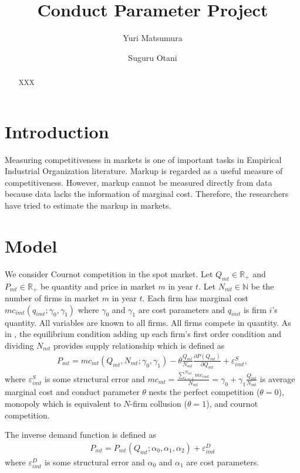 \documentclass[11pt]{article}
\title{Conduct Parameter Project}
\author{Yuri Matsumura \and Suguru Otani}
\begin{document}
\maketitle

\begin{abstract}
    XXX
\end{abstract}

\section{Introduction}
Measuring competitiveness in markets is one of important tasks in Empirical Industrial Organization literature.
Markup is regarded as a useful measure of competitiveness. 
However, markup cannot be measured directly from data because data lacks the information of marginal cost.
Therefore, the researchers have tried to estimate the markup in markets.



\section{Model}
We consider Cournot competition in the spot market. Let $Q_{mt}\in\mathbb{R}_{+}$ and $P_{mt}\in\mathbb{R}_{+}$ be quantity and price in market $m$ in year $t$. Let $N_{mt}\in\mathbb{N}$ be the number of firms in market $m$ in year $t$. Each firm has marginal cost $mc_{imt}(q_{imt};\gamma_0,\gamma_1)$ where $\gamma_0$ and $\gamma_1$ are cost parameters and $q_{imt}$ is firm $i$'s quantity. All variables are known to all firms. All firms compete in quantity. As in \cite{bresnahan1982oligopoly}, the equilibrium condition adding up each firm's first order condition and dividing $N_{mt}$ provides supply relationship which is defined as 
\begin{align}
    P_{m t}=mc_{mt}(Q_{mt},N_{mt};\gamma_0,\gamma_1)-\theta \frac{Q_{mt}}{N_{mt}} \frac{\partial P\left(Q_{m t}\right)}{\partial Q_{m t}}+\varepsilon_{imt}^{S},\label{eq:supply}
\end{align}
where $\varepsilon_{imt}^{S}$ is some structural error and $mc_{mt}=\frac{\sum_{i=1}^{N_{mt}}mc_{imt}}{N_{mt}}=\gamma_0+\gamma_1 \frac{Q_{mt}}{N_{mt}}$ is average marginal cost and conduct parameter $\theta$ nests the perfect competition ($\theta=0$), monopoly which is equivalent to $N$-firm collusion ($\theta=1$), and cournot competition.

The inverse demand function is defined as 
\begin{align}
    P_{mt}=P_{mt}(Q_{mt};\alpha_0,\alpha_1,\alpha_2)+\varepsilon_{imt}^{D}\label{eq:demand}
\end{align}
where $\varepsilon_{imt}^{D}$ is some structural error and $\alpha_0$ and $\alpha_1$ are cost parameters.
\end{document}
